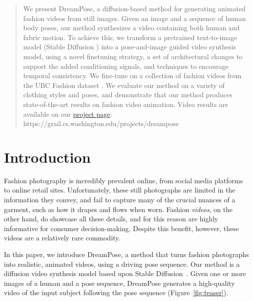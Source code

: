 \vspace{-1em}
\begin{abstract}
\vspace{-1em}
We present DreamPose, a diffusion-based method for generating animated fashion videos from still images. Given an image and a sequence of human body poses, our method synthesizes a video containing both human and fabric motion. To achieve this, we transform a pretrained text-to-image model (Stable Diffusion \cite{stable_diffusion}) into a pose-and-image guided video synthesis model, using a novel finetuning strategy, a set of architectural changes to support the added conditioning signals, and techniques to encourage temporal consistency. We fine-tune on a collection of fashion videos from the UBC Fashion dataset \cite{ubc_fashion}. We evaluate our method on a variety of clothing styles and poses, and demonstrate that our method produces state-of-the-art results on fashion video animation. Video results are available on our \href{https://grail.cs.washington.edu/projects/dreampose/}{project page}: https://grail.cs.washington.edu/projects/dreampose
\end{abstract}

\vspace{-2em}
\section{Introduction}
 Fashion photography is incredibly prevalent online, from social media platforms to online retail sites. Unfortunately, these still photographs are limited in the information they convey, and fail to capture many of the crucial nuances of a garment, such as how it drapes and flows when worn. Fashion \emph{videos}, on the other hand, do showcase all these details, and for this reason are highly informative for consumer decision-making. Despite this benefit, however, these videos are a relatively rare commodity.

In this paper, we introduce DreamPose, a method that turns fashion photographs into realistic, animated videos, using a driving pose sequence. Our method is a diffusion video synthesis model based upon Stable Diffusion~\cite{stable_diffusion}. Given one or more images of a human and a pose sequence, DreamPose generates a high-quality video of the input subject following the pose sequence (Figure~\ref{fig:teaser}).
 

